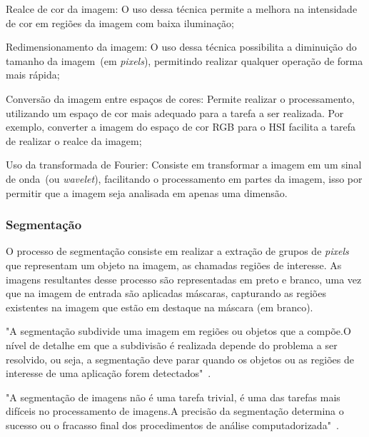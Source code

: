\documentclass[12pt,oneside,a4paper,chapter=TITLE,section=TITLE,sumario
		=tradicional]{abntex2}
\begin{document}
\begin{lista}
			\item Realce de cor da imagem: O uso dessa técnica permite a melhora na intensidade de cor em regiões da imagem com baixa iluminação;
			
			\item Redimensionamento da imagem: O uso dessa técnica possibilita a diminuição do tamanho da imagem~(em \textit{pixels}), permitindo realizar qualquer operação de forma mais rápida;
			
			\item Conversão da imagem entre espaços de cores: Permite realizar o processamento, utilizando um espaço de cor mais adequado para a tarefa a ser realizada. Por exemplo, converter a imagem do espaço de cor RGB para o HSI facilita a tarefa de realizar o realce da imagem;	
			
			\item Uso da transformada de Fourier: Consiste em transformar a imagem em um sinal de onda~(ou \textit{wavelet}), facilitando o processamento em partes da imagem, isso por permitir que a imagem seja analisada em apenas uma dimensão.
		\end{lista}
			
		\subsubsection{Segmentação}
		\label{sec:segmentacao}
		
		O processo de segmentação consiste em realizar a extração de grupos de \textit{pixels} que representam um objeto na imagem, as chamadas regiões de interesse. As imagens resultantes desse processo são representadas em preto e branco, uma vez que na imagem de entrada são aplicadas máscaras, capturando as regiões existentes na imagem que estão em destaque na máscara (em branco).
		
		\begin{citacao}
		"A segmentação subdivide uma imagem em regiões ou objetos que a compõe.\hspace{0.1cm}O nível de detalhe em que a subdivisão é realizada depende do problema a ser resolvido, ou seja, a segmentação deve parar quando os objetos ou as regiões de interesse de uma aplicação forem detectados"~\cite[p.454]{gonzalez2010processamento}.
		\end{citacao}
	
		\begin{citacao}
		"A segmentação de imagens não é uma tarefa trivial, é uma das tarefas mais difíceis no processamento de imagens.\hspace{0.1cm}A precisão da segmentação determina o sucesso ou o fracasso final dos procedimentos de análise computadorizada"~\cite[p.454]{gonzalez2010processamento}.
		\end{citacao}
	
\end{document}
